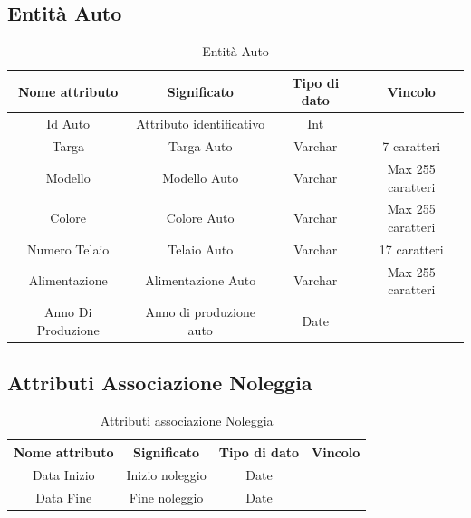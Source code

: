 \documentclass[12pt]{article}
\begin{document}
\subsection{Entità Auto}
\begin{table}[h!]
    \centering
    \begin{tabular}{|c|c|c|c|}
        \hline
        Nome attributo & Significato & Tipo di dato & Vincolo \\
        \hline
        Id Auto & Attributo identificativo & Int & \\
        \hline
        Targa & Targa Auto & Varchar & 7 caratteri \\
        \hline
        Modello & Modello Auto & Varchar & Max 255 caratteri \\ 
        \hline
        Colore & Colore Auto & Varchar &  Max 255 caratteri \\ 
        \hline
        Numero Telaio & Telaio Auto & Varchar & 17 caratteri \\
        \hline
        Alimentazione & Alimentazione Auto & Varchar & Max 255 caratteri \\
        \hline
        Anno Di Produzione & Anno di produzione auto & Date & \\
        \hline
    \end{tabular}
    \caption{Entità Auto}
    \label{tab:Entità Auto}
\end{table}

\subsection{Attributi Associazione Noleggia}
\begin{table}[h!]
    \centering
    \begin{tabular}{|c|c|c|c|}
        \hline
        Nome attributo & Significato & Tipo di dato & Vincolo \\
        \hline
        Data Inizio & Inizio noleggio & Date & \\
        \hline
        Data Fine & Fine noleggio & Date & \\
        \hline
    \end{tabular}
    \caption{Attributi associazione Noleggia}
    \label{tab:Attributi associazione Noleggia}
\end{table}

\clearpage

\end{document}
